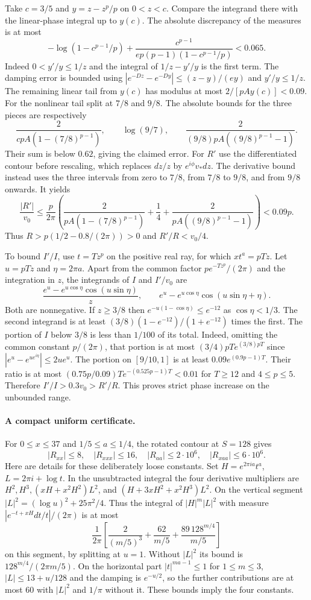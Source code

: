 \documentclass[11pt,a4paper]{article}
\numberwithin{equation}{section}
\begin{document}
Take $c=3/5$ and $y=z-z^p/p$ on $0<z<c$. Compare the integrand there
with the linear-phase integral up to $y(c)$. The absolute discrepancy
of the measures is at most
\[
 -\log(1-c^{p-1}/p)
 +\frac{c^{p-1}}{e p(p-1)(1-c^{p-1}/p)}<0.065 .
\]
Indeed $0<y'/y\le1/z$ and the integral of $1/z-y'/y$ is the first
term. The damping error is bounded using
$|e^{-Dz}-e^{-Dy}|\le(z-y)/(ey)$ and $y'/y\le1/z$.
The remaining linear tail from $y(c)$ has modulus at most
$2/[pAy(c)]<0.09$.
For the nonlinear tail split at $7/8$ and $9/8$. The absolute bounds
for the three pieces are respectively
\[
 \frac{2}{c p A(1-(7/8)^{p-1})},\qquad
 \log(9/7),\qquad
 \frac{2}{(9/8)pA((9/8)^{p-1}-1)} .
\]
Their sum is below $0.62$, giving the claimed error. For $R'$ use the
differentiated contour before rescaling, which replaces $dz/z$ by
$e^{i\phi}v_*dz$. The derivative bound instead uses the three intervals
from zero to $7/8$, from $7/8$ to $9/8$, and from $9/8$ onwards.
It yields
\[
 \frac{|R'|}{v_0}\le\frac p{2\pi}
 \left(\frac{2}{pA(1-(7/8)^{p-1})}+\frac14+
       \frac{2}{pA((9/8)^{p-1}-1)}\right)<0.09p .
\]
Thus $R>p(1/2-0.8/(2\pi))>0$ and $R'/R<v_0/4$.

To bound $I'/I$, use $t=Tz^p$ on the positive real ray, for which
$xt^a=pTz$. Let $u=pTz$ and $\eta=2\pi a$. Apart from the common
factor $p e^{-Tz^p}/(2\pi)$ and the integration in $z$, the integrands
of $I$ and $I'/v_0$ are
\[
 \frac{e^u-e^{u\cos\eta}\cos(u\sin\eta)}z,\qquad
 e^u-e^{u\cos\eta}\cos(u\sin\eta+\eta).
\]
Both are nonnegative. If $z\ge3/8$ then
$e^{-u(1-\cos\eta)}\le e^{-12}$ as $\cos\eta<1/3$.
The second integrand is at least
$(3/8)(1-e^{-12})/(1+e^{-12})$ times the first.
The portion of $I$ below $3/8$ is less than $1/100$ of its total.
Indeed, omitting the common constant $p/(2\pi)$, that portion
is at most $(3/4)pT e^{(3/8)pT}$ since
$|e^u-e^{u e^{i\eta}}|\le2u e^u$.
The portion on $[9/10,1]$ is at least
$0.09e^{(0.9p-1)T}$. Their ratio is at most
$(0.75p/0.09)T e^{-(0.525p-1)T}<0.01$ for $T\ge12$ and
$4\le p\le5$. Therefore $I'/I>0.3v_0>R'/R$. This proves strict
phase increase on the unbounded range.

\paragraph{A compact uniform certificate.}
For $0\le x\le37$ and $1/5\le a\le1/4$, the rotated contour at
$S=128$ gives
\[
 |R_{xx}|\le8,\quad |R_{xxx}|\le16,\quad
 |R_{aa}|\le2\cdot10^6,\quad |R_{xaa}|\le6\cdot10^6 .
\]
Here are details for these deliberately loose constants.
Set $H=e^{2\pi ia}t^a$, $L=2\pi i+\log t$.
In the unsubtracted integral the four derivative multipliers are
$H^2,H^3,(xH+x^2H^2)L^2$, and
$(H+3xH^2+x^2H^3)L^2$.
On the vertical segment $|L|^2=(\log u)^2+25\pi^2/4$.
Thus the integral of $|H|^m|L|^2$ with measure
$|e^{-t+xH}dt/t|/(2\pi)$ is at most
\[
 \frac1{2\pi}\left[\frac{2}{(m/5)^3}
   +\frac{62}{m/5}+\frac{89\,128^{m/4}}{m/5}\right]
\]
on this segment, by splitting at $u=1$. Without $|L|^2$ its bound is
$128^{m/4}/(2\pi m/5)$. On the horizontal part $|t|^{ma-1}\le1$
for $1\le m\le3$, $|L|\le13+u/128$ and the damping is $e^{-u/2}$,
so the further contributions are at most $60$ with $|L|^2$ and
$1/\pi$ without it. These bounds imply the four constants.
\end{document}
